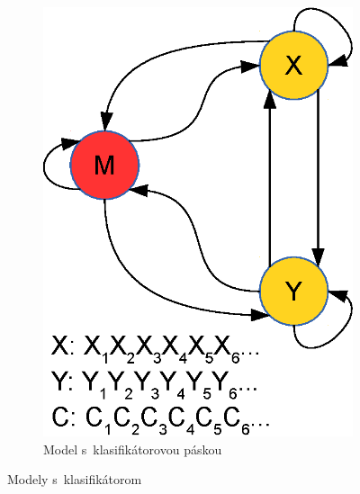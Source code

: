 \documentclass{svk_short_sk}
\begin{document}
\begin{figure}[H]
\begin{subfigure}[b]{0.17\textwidth}
                \includegraphics[width=\textwidth, clip=true]{images/model_clf_paska}
                \caption{Model s~klasifikátorovou páskou}
                \label{fig:model-clf-tape}
        \end{subfigure}
        \caption{Modely s~klasifikátorom}
\end{figure}

\nocite{*}



\end{document}
